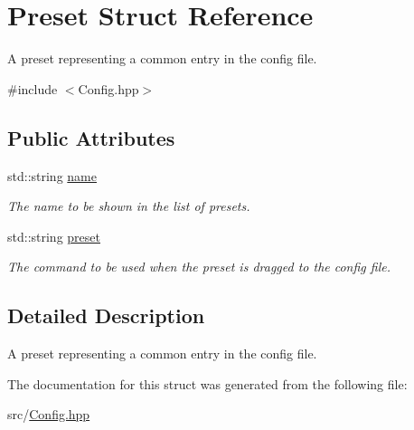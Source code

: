 \hypertarget{structPreset}{}\section{Preset Struct Reference}
\label{structPreset}


A preset representing a common entry in the config file.  




{\ttfamily \#include $<$Config.\+hpp$>$}

\subsection*{Public Attributes}
\begin{DoxyCompactItemize}
\item 
\mbox{\label{structPreset_a32643ed384b8a95b2a4216b32ce51c47}} 
std\+::string \hyperlink{structPreset_a32643ed384b8a95b2a4216b32ce51c47}{name}
\begin{DoxyCompactList}\small\item\em The name to be shown in the list of presets. \end{DoxyCompactList}\item 
\mbox{\label{structPreset_a70600a05a1f9c8d5ebe87a9f03e483ae}} 
std\+::string \hyperlink{structPreset_a70600a05a1f9c8d5ebe87a9f03e483ae}{preset}
\begin{DoxyCompactList}\small\item\em The command to be used when the preset is dragged to the config file. \end{DoxyCompactList}\end{DoxyCompactItemize}


\subsection{Detailed Description}
A preset representing a common entry in the config file. 

The documentation for this struct was generated from the following file\+:\begin{DoxyCompactItemize}
\item 
src/\hyperlink{Config_8hpp}{Config.\+hpp}\end{DoxyCompactItemize}
